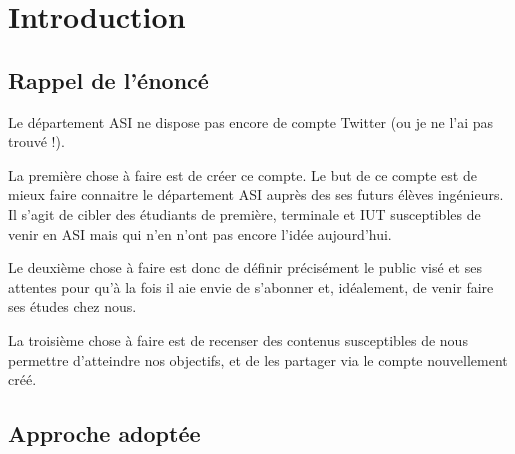 \section{Introduction}

\subsection{Rappel de l'énoncé}
Le département ASI ne dispose pas encore de compte Twitter (ou je ne l'ai pas trouvé !).
 
La première chose à faire est de créer ce compte. Le but de ce compte est de mieux faire connaitre le département ASI auprès des 
ses futurs élèves ingénieurs. Il s'agit de cibler des étudiants de première, terminale et IUT susceptibles de venir en ASI mais qui 
n'en n'ont pas encore l'idée aujourd'hui. 
 
Le deuxième chose à faire est donc de définir précisément le public visé et ses attentes pour qu'à la fois il aie envie de s'abonner 
et, idéalement, de venir faire ses études chez nous.
 
La troisième chose à faire est de recenser des contenus susceptibles de nous permettre d'atteindre nos objectifs, et de les partager via 
le compte nouvellement créé. 

\subsection{Approche adoptée}

